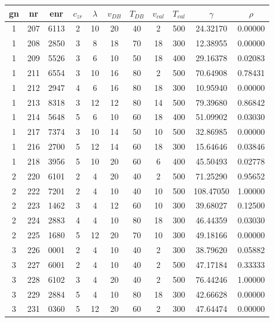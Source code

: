 \begin{table}[ht]
	\centering
	\label{tab:emma_all}
	\begin{tabular}{ccc|cccccc|cc}
        \hline\hline
		gn  &nr	    &enr	&$c_{zr}$	    &$\lambda$	&$v_{DB}$	&$T_{DB}$	&$v_{cal}$	&$T_{cal}$	&$\gamma$	&$\rho$\\
        \hline
        1   &207	&6113	&2	&10	&20	&40	&2	&500	&24.32170	&0.00000\\
        1   &208	&2850	&3	&8	&18	&70	&18	&300	&12.38955	&0.00000\\
        1   &209	&5526	&3	&6	&10	&50	&18	&400	&29.16378	&0.02083\\
        1   &211	&6554	&3	&10	&16	&80	&2	&500	&70.64908	&0.78431\\
        1   &212	&2947	&4	&6	&16	&80	&18	&300	&10.95940	&0.00000\\
        1   &213	&8318	&3	&12	&12	&80	&14	&500	&79.39680	&0.86842\\
        1   &214	&5648	&5	&6	&10	&60	&18	&400	&51.09902	&0.03030\\
        1   &217	&7374	&3	&10	&14	&50	&10	&500	&32.86985	&0.00000\\
        1   &216	&2700	&5	&12	&14	&60	&18	&300	&15.64646	&0.03846\\
        1   &218	&3956	&5	&10	&20	&60	&6	&400	&45.50493	&0.02778\\
                                                                           
        2   &220	&6101	&2	&4	&20	&40	&2	&500	&71.25290	&0.95652\\
        2   &222	&7201	&2	&4	&10	&40	&10	&500	&108.47050	&1.00000\\
        2   &223	&1462	&3	&4	&12	&60	&10	&300	&39.68027	&0.12500\\
        2   &224	&2883	&4	&4	&10	&80	&18	&300	&46.44359	&0.03030\\
        2   &225	&1680	&5	&12	&20	&70	&10	&300	&49.18166	&0.00000\\
                                                                           
        3   &226	&0001	&2	&4	&10	&40	&2	&300	&38.79620	&0.05882\\
        3   &227	&6001	&2	&4	&10	&40	&2	&500	&47.17184	&0.33333\\
        3   &228	&6102	&3	&4	&20	&40	&2	&500	&76.44246	&1.00000\\
        3   &229	&2884	&5	&4	&10	&80	&18	&300	&42.66628	&0.00000\\
        3   &231	&0360	&5	&12	&20	&60	&2	&300	&47.64474	&0.00000\\
                                                                           

\end{tabular}
\end{table}
